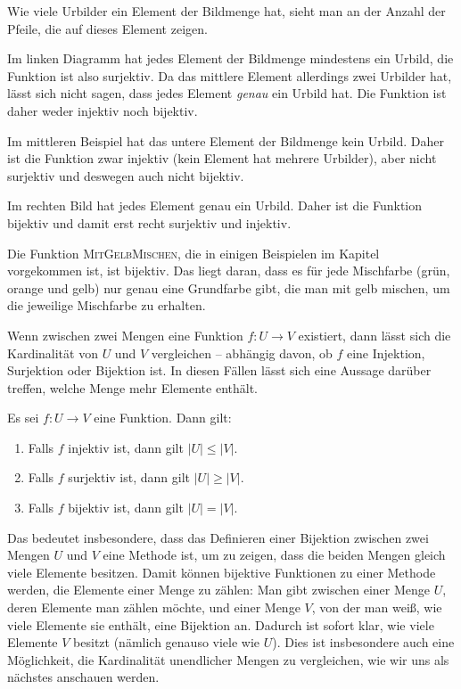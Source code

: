 \documentclass[../../main.tex]{subfiles}
\begin{document}
Wie viele Urbilder ein Element der Bildmenge hat, sieht man an der Anzahl der Pfeile, die auf dieses Element zeigen.

Im linken Diagramm hat jedes Element der Bildmenge mindestens ein Urbild, die Funktion ist also surjektiv. Da das 
mittlere Element allerdings zwei Urbilder hat, lässt sich nicht sagen, dass jedes Element \emph{genau} ein Urbild hat. 
Die Funktion ist daher weder injektiv noch bijektiv.

Im mittleren Beispiel hat das untere Element der Bildmenge kein Urbild. Daher ist die Funktion zwar injektiv (kein Element hat mehrere Urbilder), aber nicht surjektiv und deswegen auch nicht bijektiv.

Im rechten Bild hat jedes Element genau ein Urbild. Daher ist die Funktion bijektiv und damit erst recht surjektiv und injektiv.

\begin{example}{}
    Die Funktion \textsc{MitGelbMischen}, die in einigen Beispielen im Kapitel vorgekommen ist, ist bijektiv. Das liegt daran, dass es für jede Mischfarbe (grün, orange und gelb) nur genau eine Grundfarbe gibt, die man mit gelb mischen, um die jeweilige Mischfarbe zu erhalten.
\end{example}

Wenn zwischen zwei Mengen eine Funktion $f\colon U\rightarrow V$ existiert, dann lässt sich die Kardinalität von $U$ und $V$ vergleichen -- abhängig davon, ob $f$ eine Injektion, Surjektion oder Bijektion ist. In diesen Fällen lässt sich eine Aussage darüber treffen, welche Menge mehr Elemente enthält.

\begin{theorem}{}
    Es sei $f\colon U\rightarrow V$ eine Funktion. Dann gilt:
    \begin{enumerate}
        \item Falls $f$ injektiv ist, dann gilt $|U|\leq |V|$.
        \item Falls $f$ surjektiv ist, dann gilt $|U|\geq |V|$.
        \item Falls $f$ bijektiv ist, dann gilt $|U|=|V|$.
    \end{enumerate}
\end{theorem}

Das bedeutet insbesondere, dass das Definieren einer Bijektion zwischen zwei Mengen $U$ und $V$ eine Methode ist, um zu 
zeigen, dass die beiden Mengen gleich viele Elemente besitzen. Damit können bijektive Funktionen zu einer Methode 
werden, die Elemente einer Menge zu zählen: Man gibt zwischen einer Menge $U$, deren Elemente man zählen möchte, und 
einer Menge $V$, von der man weiß, wie viele Elemente sie enthält, eine Bijektion an. Dadurch ist sofort klar, wie 
viele Elemente $V$ besitzt (nämlich genauso viele wie $U$). Dies ist insbesondere auch eine Möglichkeit, die Kardinalität 
unendlicher Mengen zu vergleichen, wie wir uns als nächstes anschauen werden.
\end{document}
